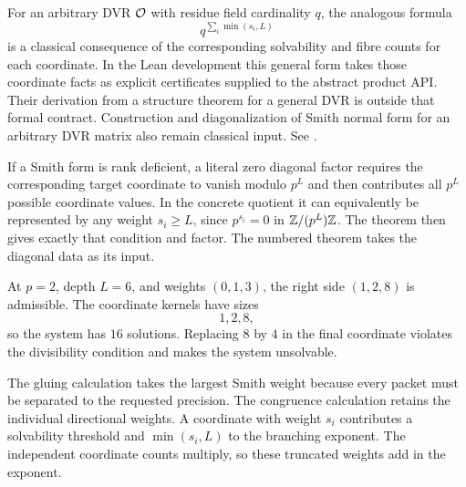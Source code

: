 For an arbitrary DVR ${\mathcal O}$ with residue field cardinality $q$, the analogous
formula
\[
q^{\sum_i\min(s_i,L)}
\]
is a classical consequence of the corresponding solvability and fibre counts
for each coordinate. In the Lean development this general form takes those
coordinate facts as explicit certificates supplied to the abstract product
API. Their derivation from a structure theorem for a general DVR is outside
that formal contract. Construction and diagonalization of Smith normal form
for an arbitrary DVR matrix also remain classical input. See
\cite{Serre1979,Lang2002}.

If a Smith form is rank deficient, a literal zero diagonal factor requires
the corresponding target coordinate to vanish modulo $p^L$ and then
contributes all $p^L$ possible coordinate values. In the concrete quotient it
can equivalently be represented by any weight $s_i\ge L$, since
$p^{s_i}=0$ in $\mathbb Z/(p^L)\mathbb Z$. The theorem then gives exactly that condition and
factor. The numbered theorem takes the diagonal data as its input.

\begin{example}
At $p=2$, depth $L=6$, and weights $(0,1,3)$, the right side $(1,2,8)$ is admissible. The coordinate kernels have sizes
\[
1,2,8,
\]
so the system has $16$ solutions. Replacing $8$ by $4$ in the final coordinate violates the divisibility condition and makes the system unsolvable.
\end{example}

\begin{interpretation}
The gluing calculation takes the largest Smith weight because every packet must be separated to the requested precision. The congruence calculation retains the individual directional weights. A coordinate with weight $s_i$ contributes a solvability threshold and $\min(s_i,L)$ to the branching exponent. The independent coordinate counts multiply, so these truncated weights add in the exponent.
\end{interpretation}


